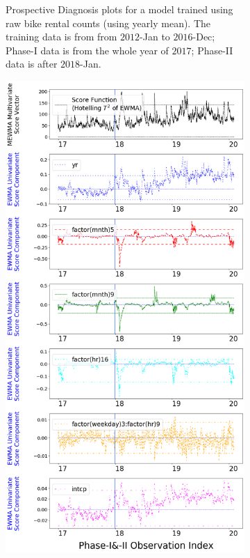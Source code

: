 \documentclass[twoside,11pt]{article}
\begin{document}
\begin{enumerate}
\begin{figure}[H]
\begin{subfigure}[t]{0.32\linewidth}
     \captionsetup{width=.95\linewidth}
     \caption{Prospective Diagnosis plots for a model trained using raw bike rental counts (using yearly mean). The training data is from from $2012$-Jan to $2016$-Dec; Phase-I data is from the whole year of $2017$; Phase-II data is after $2018$-Jan.}
     \label{fig:bs_raw_cnt_1}
\end{subfigure}
\begin{subfigure}[t]{0.32\linewidth}
     \centering
         \includegraphics[width=1.0\textwidth, trim=.0in .0in .0in .0in, clip]{../figures/v14/bike_sharing/reg_lin_E_2/neg_single_bike_fisher_mlines_with_regu_1e-08_0_0001_0_01_99_99.png}

\end{subfigure}
\end{figure}
\end{enumerate}
\end{document}

